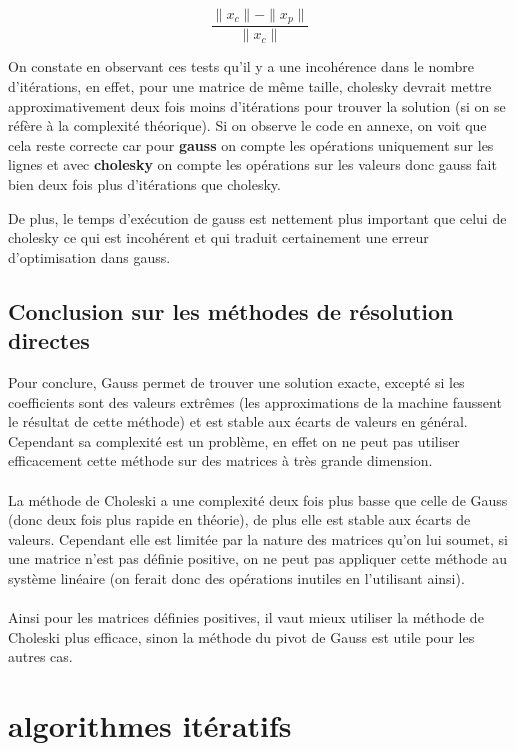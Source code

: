 \documentclass[a4paper]{article}
\begin{document}
\begin{itemize}
  \[\frac{\parallel x_{c} \parallel - \parallel x_{p} \parallel}{\parallel x_{c}
    \parallel}\]
  
  On constate en observant ces tests qu'il y a une incohérence dans le nombre
  d'itérations, en effet, pour une matrice de même taille, cholesky devrait
  mettre approximativement deux fois moins d'itérations pour trouver la solution
  (si on se réfère à la complexité théorique). Si on observe le code en annexe,
  on voit que cela reste correcte car pour \textbf{gauss} on compte les
  opérations uniquement sur les lignes et avec \textbf{cholesky} on compte les
  opérations sur les valeurs donc gauss fait bien deux fois plus d'itérations
  que cholesky.

  De plus, le temps d’exécution de gauss est nettement plus important que celui
  de cholesky ce qui est incohérent et qui traduit certainement une erreur
  d'optimisation dans gauss.
\end{itemize}

\subsection{Conclusion sur les méthodes de résolution directes}

 Pour conclure, Gauss permet de trouver une solution exacte, excepté si les
 coefficients sont des valeurs extrêmes (les approximations de la machine faussent
 le résultat de cette méthode) et est stable aux écarts de valeurs en
 général. Cependant sa complexité est un problème, en effet on ne peut pas
 utiliser efficacement cette méthode sur des matrices à très grande dimension.
 \\
 \\
 La méthode de Choleski a une complexité deux fois plus basse que celle de
 Gauss (donc deux fois plus rapide en théorie), de plus elle est stable aux
 écarts de valeurs. Cependant elle est limitée par la nature des matrices qu'on
 lui soumet, si une matrice n'est pas définie positive, on ne peut pas appliquer
 cette méthode au système linéaire (on ferait donc des opérations inutiles en
 l'utilisant ainsi).
 \\
 \\
 Ainsi pour les matrices définies positives, il vaut
 mieux utiliser la méthode de Choleski plus efficace, sinon la méthode du pivot
 de Gauss est utile pour les autres cas.

\section{algorithmes itératifs}
\end{document}
